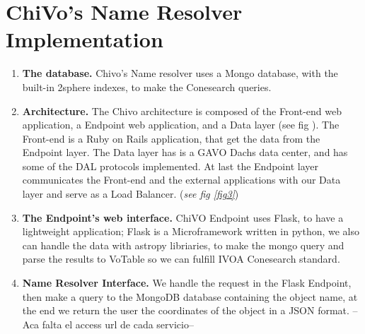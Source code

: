 \documentclass[11pt,twoside]{article}
\begin{document}
\section{ChiVo's Name Resolver Implementation}
\begin{enumerate}

\item  \textbf{The database.} Chivo's Name resolver uses a Mongo database, with the built-in 2sphere indexes, to make the Conesearch queries. 

\item  \textbf{Architecture.}  The Chivo architecture is composed of the Front-end web application, a Endpoint web application, and a Data layer (see fig ). The Front-end is a Ruby on Rails application, that get the data from the Endpoint layer. The Data layer has is a GAVO Dachs data center, and has some of the DAL protocols implemented. At last the Endpoint layer communicates the Front-end and the external applications with our Data layer and serve as a Load Balancer. (\emph{see fig \ref{fig3}})


\item  \textbf{The Endpoint’s web interface.} ChiVO Endpoint uses Flask, to have a lightweight application; Flask is a Microframework written in python, we also can handle the data with astropy
libriaries, to make the mongo query and parse the results to VoTable so we can fulfill IVOA Conesearch standard.

\item \textbf{Name Resolver Interface.} We handle the request in the Flask Endpoint, then make a query to the MongoDB database containing the object name, at the end we return the user the coordinates of the object in a JSON format. --Aca falta el access url de cada servicio--

\end{enumerate}



\end{document}
